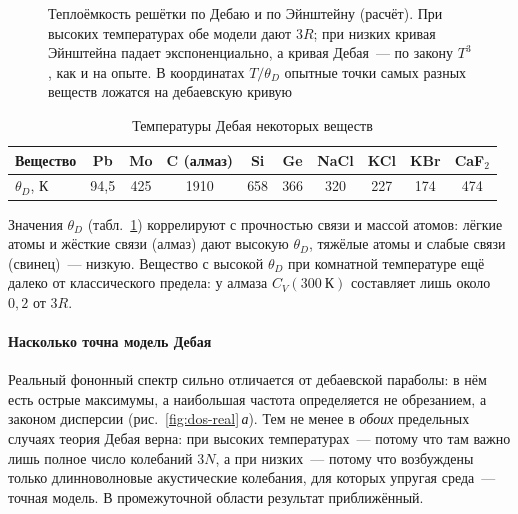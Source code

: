 \begin{figure}[ht]
\centering
{}
\caption{Теплоёмкость решётки по Дебаю и по Эйнштейну (расчёт). При высоких
температурах обе модели дают $3R$; при низких кривая Эйнштейна падает
экспоненциально, а кривая Дебая~— по закону $T^3$, как и на опыте.
В координатах $T/\theta_D$ опытные точки самых разных веществ ложатся на
дебаевскую кривую}
\label{fig:cv-debye}
\end{figure}

\begin{table}[ht]
\centering
\caption{Температуры Дебая некоторых веществ}\label{tab:thetaD}
\small
\begin{tabular}{lccccccccc}
\toprule
Вещество & Pb & Mo & C (алмаз) & Si & Ge & NaCl & KCl & KBr & CaF$_2$\\
\midrule
$\theta_D$, К & 94,5 & 425 & 1910 & 658 & 366 & 320 & 227 & 174 & 474\\
\bottomrule
\end{tabular}
\end{table}

Значения $\theta_D$ (табл.~\ref{tab:thetaD}) коррелируют с прочностью связи и
массой атомов: лёгкие атомы и жёсткие связи (алмаз) дают высокую $\theta_D$,
тяжёлые атомы и слабые связи (свинец)~— низкую. Вещество с высокой
$\theta_D$ при комнатной температуре ещё далеко от классического предела:
у алмаза $C_V(300~\text{К})$ составляет лишь около $0{,}2$ от $3R$.

\paragraph{Насколько точна модель Дебая}
Реальный фононный спектр сильно отличается от дебаевской параболы: в нём
есть острые максимумы, а наибольшая частота определяется не обрезанием, а
законом дисперсии (рис.~\ref{fig:dos-real}\,\textit{а}). Тем не менее в
\emph{обоих} предельных случаях теория Дебая верна: при высоких
температурах~— потому что там важно лишь полное число колебаний $3N$, а при
низких~— потому что возбуждены только длинноволновые акустические
колебания, для которых упругая среда~— точная модель. В промежуточной
области результат приближённый.

